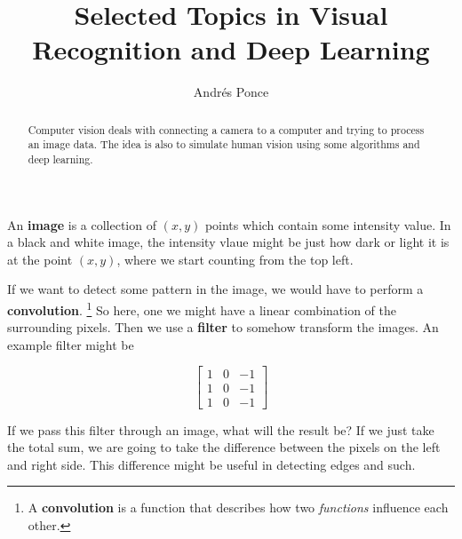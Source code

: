 \documentclass{tufte-handout}
\title{Selected Topics in Visual Recognition and Deep Learning}
\author{Andr\'es Ponce}
\begin{document}
\maketitle

\begin{abstract}
	Computer vision deals with connecting a camera to a computer and
	trying to process an image data. The idea is also to simulate 
	human vision using some algorithms and deep learning.
\end{abstract}

An \textbf{image} is a collection of $(x,y)$ points which contain some 
intensity value.
In a black and white image, the intensity vlaue might be just how dark or
light it is at the point $(x,y)$, where we start counting from the top left.

If we want to detect some pattern in the image, we would have to perform a 
\textbf{convolution}.
\footnote{A \textbf{convolution} is a function that describes how two 
\textit{functions} influence each other.} 
So here, one we might have a linear combination of the surrounding pixels.
Then we use a \textbf{filter} to somehow transform the images.
An example filter might be 

\begin{center}
	\[
	\begin{bmatrix}
		1 & 0 & -1\\
		1 & 0 & -1\\
		1 & 0 & -1
	\end{bmatrix}
	\]
\end{center}

If we pass this filter through an image, what will the result be? 
If we just take the total sum, we are going to take the difference between the 
pixels on the left and right side.
This difference might be useful in detecting edges and such.

%
\end{document}
